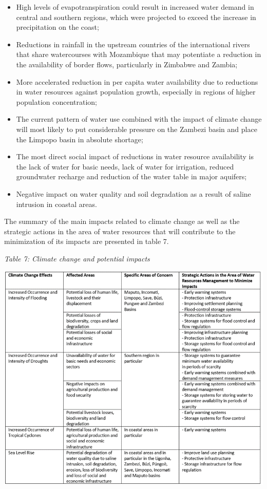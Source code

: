 \documentclass[
]{book}
\begin{document}
\begin{itemize}
\item
  High levels of evapotranspiration could result in increased water demand in central and southern regions, which were projected to exceed the increase in precipitation on the coast;
\item
  Reductions in rainfall in the upstream countries of the international rivers that share watercourses with Mozambique that may potentiate a reduction in the availability of border flows, particularly in Zimbabwe and Zambia;
\item
  More accelerated reduction in per capita water availability due to reductions in water resources against population growth, especially in regions of higher population concentration;
\item
  The current pattern of water use combined with the impact of climate change will most likely to put considerable pressure on the Zambezi basin and place the Limpopo basin in absolute shortage;
\item
  The most direct social impact of reductions in water resource availability is the lack of water for basic needs, lack of water for irrigation, reduced groundwater recharge and reduction of the water table in major aquifers;
\item
  Negative impact on water quality and soil degradation as a result of saline intrusion in coastal areas.
\end{itemize}

The summary of the main impacts related to climate change as well as the strategic actions in the area of water resources that will contribute to the minimization of its impacts are presented in table 7.

\emph{Table 7: Climate change and potential impacts}

\includegraphics{Figure33.png}
\end{document}
